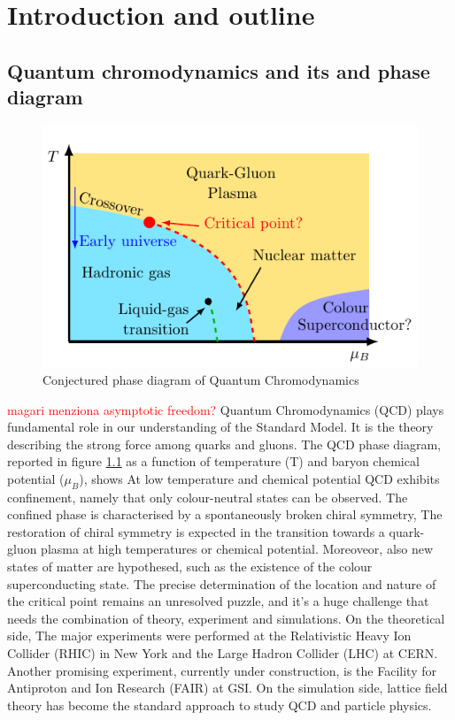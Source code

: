 \chapter{Introduction and outline}
\label{chap:introduction}

\section{Quantum chromodynamics and its and phase diagram}
\begin{figure}[htp]
    \centering 
    \includegraphics[scale=1.3]{figures/phase_diagram.pdf}
    \caption{Conjectured phase diagram of Quantum Chromodynamics}
    \label{fig:QCD_phase_diagram}
\end{figure}
\textcolor{red}{magari menziona asymptotic freedom?}
Quantum Chromodynamics (QCD) plays fundamental role in our understanding of the Standard Model. It is the theory describing the strong force among quarks and gluons.
The QCD phase diagram, reported in figure \ref{fig:QCD_phase_diagram} as a function of temperature (T) and baryon chemical potential ($\mu_B$), shows
At low temperature and chemical potential QCD exhibits confinement, namely that only colour-neutral states can be observed. The confined phase is characterised by a spontaneously broken chiral symmetry, 
The restoration of chiral symmetry is expected in the transition towards a quark-gluon plasma at high temperatures or chemical potential. Moreoveor, also new states of matter are hypothesed, such as the existence of the colour superconducting state.
The precise determination of the location and nature of the critical point remains an unresolved puzzle, and it's a huge challenge that needs the combination of theory, experiment and simulations.
On the theoretical side, 
The major experiments were performed at the Relativistic Heavy Ion Collider (RHIC) in New York and the Large Hadron
Collider (LHC) at CERN. Another promising experiment, currently under construction, is the Facility for Antiproton
and Ion Research (FAIR) at GSI. On the simulation side, lattice field theory has become the standard approach to study QCD and particle physics.
